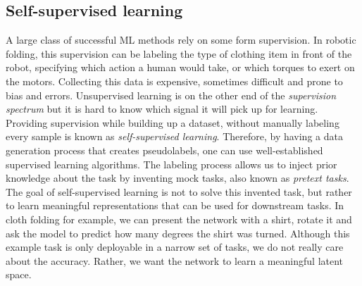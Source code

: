 \documentclass[\home/main.tex]{subfiles}
\begin{document}
\subsection{Self-supervised learning}
A large class of successful \acrshort{ML} methods rely on some form supervision. In robotic folding, this supervision can be labeling the type of clothing item in front of the robot, specifying which action a human would take, or which torques to exert on the motors. Collecting this data is expensive, sometimes difficult and prone to bias and errors. Unsupervised learning is on the other end of the \textit{supervision spectrum} but it is hard to know which signal it will pick up for learning. Providing supervision while building up a dataset, without manually labeling every sample is known as \emph{self-supervised learning}. Therefore, by having a data generation process that creates pseudolabels, one can use well-established supervised learning algorithms. The labeling process allows us to inject prior knowledge about the task by inventing mock tasks, also known as \emph{pretext tasks}. The goal of self-supervised learning is not to solve this invented task, but rather to learn meaningful representations that can be used for downstream tasks. In cloth folding for example, we can present the network with a shirt, rotate it and ask the model to predict how many degrees the shirt was turned. Although this example task is only deployable in a narrow set of tasks, we do not really care about the accuracy. Rather, we want the network to learn a meaningful latent space. 
\end{document}
